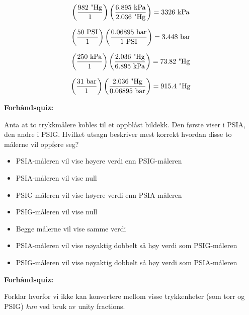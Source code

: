 $$\left(982 \hbox{ "Hg} \over 1 \right) \left(6.895 \hbox{ kPa} \over 2.036 \hbox{ "Hg}\right) = 3326 \hbox{ kPa} $$

$$\left(50 \hbox{ PSI} \over 1 \right) \left(0.06895 \hbox{ bar} \over 1 \hbox{ PSI}\right) = 3.448 \hbox{ bar} $$

$$\left(250 \hbox{ kPa} \over 1 \right) \left(2.036 \hbox{ "Hg} \over 6.895 \hbox{ kPa}\right) = 73.82 \hbox{ "Hg} $$

$$\left(31 \hbox{ bar} \over 1 \right) \left(2.036 \hbox{ "Hg} \over 0.06895 \hbox{ bar}\right) = 915.4 \hbox{ "Hg} $$







\vfil \eject

\noindent
{\bf Forhåndsquiz:}

Anta at to trykkmålere kobles til et oppblåst bildekk. Den første viser i PSIA, den andre i PSIG. Hvilket utsagn beskriver mest korrekt hvordan disse to målerne vil oppføre seg?

\begin{itemize}
\item{} PSIA-måleren vil vise høyere verdi enn PSIG-måleren
\vskip 5pt
\item{} PSIA-måleren vil vise null
\vskip 5pt
\item{} PSIG-måleren vil vise høyere verdi enn PSIA-måleren
\vskip 5pt
\item{} PSIG-måleren vil vise null
\vskip 5pt
\item{} Begge målerne vil vise samme verdi
\vskip 5pt
\item{} PSIA-måleren vil vise nøyaktig dobbelt så høy verdi som PSIG-måleren
\vskip 5pt
\item{} PSIG-måleren vil vise nøyaktig dobbelt så høy verdi som PSIA-måleren
\end{itemize}






\vfil \eject

\noindent
{\bf Forhåndsquiz:}

Forklar hvorfor vi ikke kan konvertere mellom visse trykkenheter (som torr og PSIG) {\it kun} ved bruk av unity fractions.



